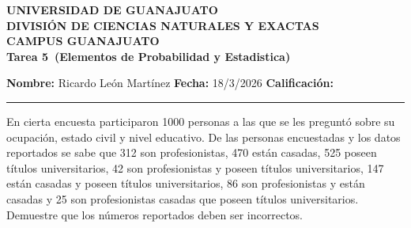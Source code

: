\documentclass[12pt,a4paper]{article}
\newcommand{\alumno}{Ricardo León Martínez}
\newcommand{\materia}{Elementos de Probabilidad y Estadistica}
\newcommand{\tarea}{Tarea 5}
\newcommand{\fecha}{18/3/2026}
\begin{document}
    \begin{center}
        {\large\textbf{UNIVERSIDAD DE GUANAJUATO}}\\[0.3cm]
        {\normalsize\textbf{DIVISIÓN DE CIENCIAS NATURALES Y EXACTAS}}\\
        {\normalsize\textbf{CAMPUS GUANAJUATO}}\\[1cm]

        {\Large\textbf{\tarea\ (\materia)}}\\[1cm]
    \end{center}

    \noindent
    \textbf{Nombre:} \alumno 
    \hfill 
    \textbf{Fecha:} \fecha 
    \hfill 
    \textbf{Calificación:} \rule{3cm}{0.4pt}

    \vspace{0.3cm}

    \begin{mdframed}[style=mdbluebox,frametitle={Ejercicio 1}]
        En cierta encuesta participaron 1000 personas a las que se les preguntó sobre su ocupación,
        estado civil y nivel educativo. De las personas encuestadas y los datos reportados se sabe que 312
        son profesionistas, 470 están casadas, 525 poseen títulos universitarios, 42 son profesionistas y poseen
        títulos universitarios, 147 están casadas y poseen títulos universitarios, 86 son profesionistas y están
        casadas y 25 son profesionistas casadas que poseen títulos universitarios. Demuestre que los números
        reportados deben ser incorrectos.
    \end{mdframed}
\end{document}
